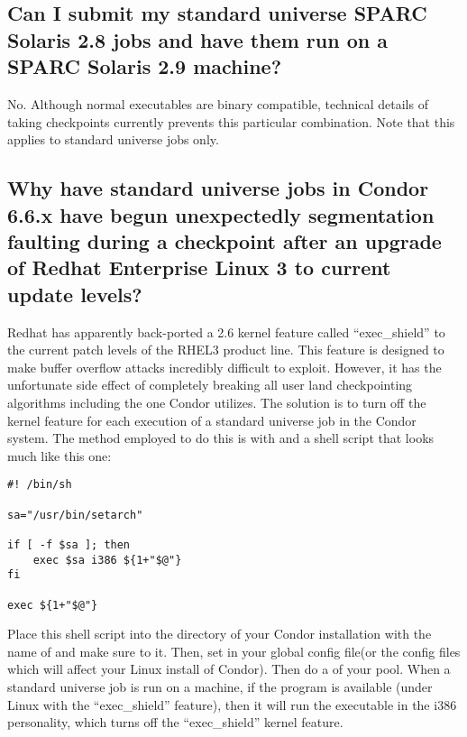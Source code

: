 \subsection*{Can I submit my standard universe SPARC Solaris 2.8 jobs and have them run on a SPARC Solaris 2.9 machine?}

No.  Although normal executables are binary compatible, technical details
of taking checkpoints currently prevents this particular combination.
Note that this applies to standard universe jobs only.

\subsection*{Why have standard universe jobs in Condor 6.6.x have begun unexpectedly segmentation faulting during a checkpoint after an upgrade of Redhat Enterprise Linux 3 to current update levels?}

Redhat has apparently back-ported a 2.6 kernel feature called
``exec\_shield'' to the current patch levels of the RHEL3 product line. 
This feature is designed to make buffer overflow attacks incredibly difficult
to exploit. 
However, it has the unfortunate side effect of completely breaking all
user land checkpointing algorithms including the one Condor utilizes.
The solution is to turn off the kernel feature for each execution of a 
standard universe job in the Condor system.
The method employed to do this is with  and a shell
script that looks much like this one:

\begin{verbatim}
#! /bin/sh

sa="/usr/bin/setarch"

if [ -f $sa ]; then
    exec $sa i386 ${1+"$@"}
fi

exec ${1+"$@"}
\end{verbatim}

Place this shell script into the  directory of your Condor
installation with the name of  and make sure to 
 it. 
Then, set  in your
global config file(or the config files which will affect your Linux install
of Condor).
Then do a  of your pool.
When a standard universe job is run on a machine, if the  
program is available (under Linux with the ``exec\_shield'' feature), then it
will run the executable in the i386 personality, which turns off the 
``exec\_shield'' kernel feature.

